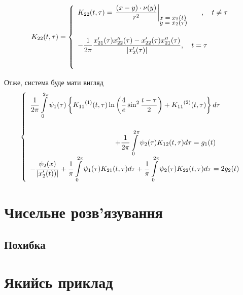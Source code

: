\documentclass[14pt,a4paper]{extarticle}
\newcounter{e}
\newcommand{\intl}{\int\limits}
\begin{document}
 $$
 K_{22}(t, \tau) = 
 \left\{
 \begin{array}{l}
	\displaystyle
	K_{22}(t, \tau) = \left.
	\frac{(x - y) \cdot \nu(y)}{r^2}
	\right|_{
		\small \parbox{20mm}{$ x = x_2(t)$ \\[-4pt] $y = x_2 ({\tau})$}
	}, \quad t \neq \tau
	\\ [1cm]
	
	\displaystyle
	- \frac{1}{2\pi} \frac{x'_{21}(\tau) x''_{22}(\tau) - x'_{22}(\tau) x''_{21}(\tau) }{\abs{x'_{2}(\tau)}}
	,\quad t = \tau
	\\ [1cm]	
 \end{array}
 \right.
 $$
 
Отже, система буде мати вигляд
 $$
 \left\{
 \begin{array}{l}
 	\displaystyle
 	\frac{1}{2\pi} \intl_{0}^{2\pi} \psi_1(\tau) \left\{ {K_{11}}^{(1)}  (t, \tau) \ln{\left( \frac{4}{e} \sin^{2}{\frac{t - \tau}{2}}   \right) }  +  {K_{11}}^{(2)} (t, \tau) \right\} d \tau
 	\\[1cm] \quad \quad \quad \quad \quad \quad \quad \quad \quad \quad \quad \quad
 	
 	\displaystyle
 	+ \frac{1}{2\pi} \intl_{0}^{2\pi}  \psi_2(\tau) K_{12}(t, \tau) d \tau
 	= g_{1}(t)
 	\\ [0.3cm]
 	
 	\displaystyle
 	- \frac{\psi_2(x)}{\abs{x'_{2}(t))}}
 	+ \frac{1}{\pi}\intl_{0}^{2\pi} \psi_1(\tau) K_{21}(t, \tau) d \tau
 	+ \frac{1}{\pi}\intl_{0}^{2\pi}  \psi_2(\tau) K_{22}(t, \tau) d \tau
 	= 2g_{2}(t)
 \end{array}\right.
 $$
 
 
 


 \section{Чисельне розв'язування}
 \subsection{Похибка}
 
 \section{Якийсь приклад}
 
	
\end{document}
